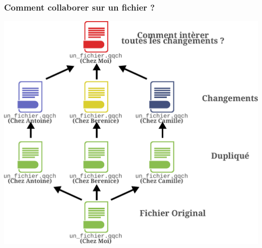 \documentclass[table,tikz,12pt,svgnames]{beamer}
\begin{document}
\begin{frame}
	\frametitle{Comment collaborer sur un fichier ? }
	\vspace{-1em}
	\begin{block}{}
    \begin{adjustwidth}{-0.5cm}{}
		\begin{center}
		{\includegraphics[scale=0.38]{images/file_share.pdf}}
		\end{center}
	\end{adjustwidth}
	\end{block}
\end{frame}
\end{document}
